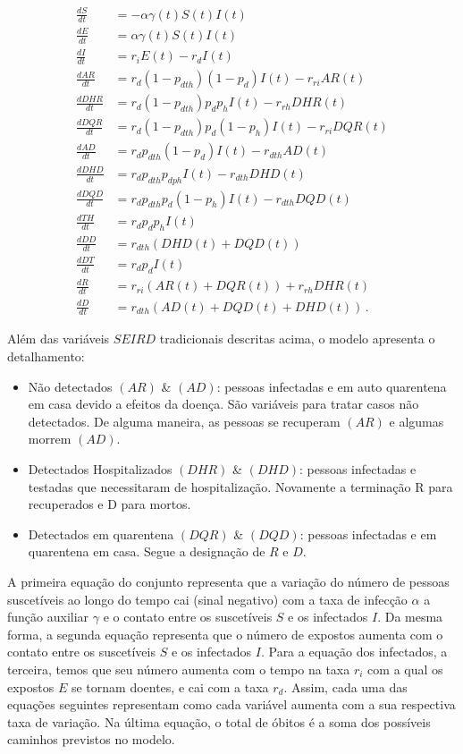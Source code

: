 \documentclass[12pt]{article}
\begin{document}
\begin{align*}
 \frac{dS}{dt} & = - \alpha \gamma(t) S(t) I(t) \\
 \frac{dE}{dt} & = \alpha \gamma(t) S(t) I(t) \\
 \frac{dI}{dt} & = r_i E(t) - r_d I(t) \\
 \frac{d AR}{dt} & = r_d(1 - p_{dth})(1 - p_d) I(t) - r_{ri} AR(t) \\
 \frac{d DHR}{dt} & =  r_d (1 - p_{dth}) p_d p_h I(t) - r_{rh} DHR(t) \\
 \frac{d DQR}{dt} & = r_d (1 - p_{dth}) p_d (1 - p_h) I(t) - r_{ri} DQR(t) \\
 \frac{d AD}{dt} & =  r_d p_{dth} (1 - p_d) I(t) - r_{dth} AD(t) \\
 \frac{d DHD}{dt} & =  r_d p_{dth} p_{dph} I(t) - r_{dth} DHD(t) \\
 \frac{d DQD}{dt} & =  r_d p_{dth} p_d(1 - p_h) I(t) - r_{dth} DQD(t) \\
 \frac{d TH}{dt} & = r_d p_d p_h I(t)  \\
 \frac{d DD}{dt} & =  r_{dth} (DHD(t) + DQD(t)) \\
 \frac{d DT}{dt} & = r_d  p_d I(t) \\
 \frac{d R}{dt} & =  r_{ri} (AR(t) + DQR(t)) + r_{rh} DHR(t) \\
 \frac{d D}{dt} & =  r_{dth} (AD(t) + DQD(t) + DHD(t)) \, .
\end{align*}

Além das variáveis $SEIRD$ tradicionais descritas acima, o modelo apresenta o detalhamento: 
\begin{itemize}
\item Não detectados $(AR)$ \& $(AD)$: pessoas infectadas e em auto quarentena em casa devido a efeitos da doença. São variáveis para tratar casos não detectados. De alguma maneira, as pessoas se recuperam $(AR)$ e algumas morrem  $(AD)$.

\item Detectados Hospitalizados $(DHR)$ \& $(DHD)$: pessoas infectadas e testadas que necessitaram de hospitalização. Novamente a terminação R para recuperados e D para mortos.

\item Detectados em quarentena $(DQR)$ \& $(DQD)$: pessoas infectadas e em quarentena em casa. Segue a designação de $R$ e $D$.

\end{itemize}

A primeira equação do conjunto representa que a variação do número de pessoas suscetíveis ao longo do tempo cai (sinal negativo) com a taxa de infecção $\alpha$ a função auxiliar $\gamma$ e o contato entre os suscetíveis $S$ e os infectados $I$. Da mesma forma, a segunda equação representa que o número de expostos aumenta com o contato entre os suscetíveis $S$ e os infectados $I$. Para a equação dos infectados, a terceira, temos que seu número aumenta com o tempo na taxa $r_i$ com a qual os expostos $E$ se tornam doentes, e cai com a taxa $r_d$. Assim, cada uma das equações seguintes representam como cada variável aumenta com a sua respectiva taxa de variação.  Na última equação, o total de óbitos é a soma dos possíveis caminhos previstos no modelo.
\end{document}
